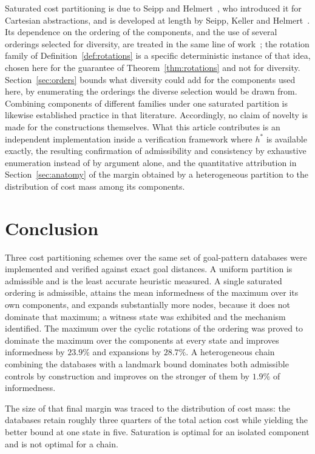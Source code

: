 \documentclass[10pt,twocolumn,a4paper]{article}
\theoremstyle{plain}
\theoremstyle{definition}
\theoremstyle{remark}
\newcommand{\hstar}{h^{*}}
\begin{document}
Saturated cost partitioning is due to Seipp and Helmert~\cite{seipp2014}, who
introduced it for Cartesian abstractions, and is developed at length by Seipp,
Keller and Helmert~\cite{seipp2020}. Its dependence on the ordering of the
components, and the use of several orderings selected for diversity, are
treated in the same line of work~\cite{seipp2017,seipp2020}; the rotation
family of Definition~\ref{def:rotations} is a specific deterministic instance
of that idea, chosen here for the guarantee of Theorem~\ref{thm:rotations} and
not for diversity. Section~\ref{sec:orders} bounds what diversity could add
for the components used here, by enumerating the orderings the diverse
selection would be drawn from. Combining components of different families under one
saturated partition is likewise established practice in that
literature. Accordingly, no claim of novelty is made for the constructions
themselves. What this article contributes is an independent implementation
inside a verification framework where $\hstar$ is available exactly, the
resulting confirmation of admissibility and consistency by exhaustive
enumeration instead of by argument alone, and the quantitative attribution in
Section~\ref{sec:anatomy} of the margin obtained by a heterogeneous partition
to the distribution of cost mass among its components.

\section{Conclusion}
\label{sec:conclusion}

Three cost partitioning schemes over the same set of goal-pattern databases
were implemented and verified against exact goal distances. A uniform partition
is admissible and is the least accurate heuristic measured. A single saturated
ordering is admissible, attains the mean informedness of the maximum over its
own components, and expands substantially more nodes, because it does not
dominate that maximum; a witness state was exhibited and the mechanism
identified. The maximum over the cyclic rotations of the ordering was proved to
dominate the maximum over the components at every state and improves
informedness by $23.9\%$ and expansions by $28.7\%$. A heterogeneous chain
combining the databases with a landmark bound dominates both admissible
controls by construction and improves on the stronger of them by $1.9\%$ of
informedness.

The size of that final margin was traced to the distribution of cost mass: the
databases retain roughly three quarters of the total action cost while yielding
the better bound at one state in five. Saturation is optimal for an isolated
component and is not optimal for a chain.
\end{document}
